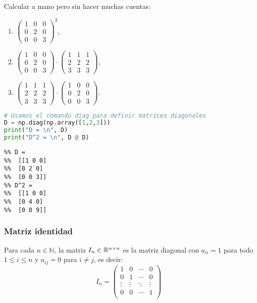 \begin{ejercicio} Calcular a mano pero sin hacer muchas cuentas:
\begin{enumerate}
\item   $\begin{pmatrix}1&0&0 \\ 0&2&0 \\ 0& 0 & 3\end{pmatrix}^3$,
\item   $\begin{pmatrix}1&0&0 \\ 0&2&0 \\ 0& 0 & 3\end{pmatrix} \cdot \begin{pmatrix}1&1&1 \\ 2&2&2 \\ 3& 3 & 3\end{pmatrix}$,
\item   $\begin{pmatrix}1&1&1 \\ 2&2&2 \\ 3& 3 & 3\end{pmatrix} \cdot \begin{pmatrix}1&0&0 \\ 0&2&0 \\ 0& 0 & 3\end{pmatrix}$.
\end{enumerate}
\end{ejercicio}

\begin{Shaded}
\begin{lstlisting}[language=Python]
# Usamos el comando diag para definir matrices diagonales
D = np.diag(np.array([1,2,3]))
print("D = \n", D)
print("D^2 = \n", D @ D)
\end{lstlisting}
\end{Shaded}

\begin{verbatim}
%% D =
%%  [[1 0 0]
%%  [0 2 0]
%%  [0 0 3]]
%% D^2 =
%%  [[1 0 0]
%%  [0 4 0]
%%  [0 0 9]]
\end{verbatim}

\subsubsection{Matriz identidad}

Para cada $n \in \mathbb{N}$, la matriz $I_n \in \mathbb R^{n \times n}$ es la matriz diagonal con $a_{ii} = 1$ para todo $1 \le i \le n$ y $a_{ij} = 0$ para $i \ne j$, es decir:
$$
I_n =\begin{pmatrix}1&0&\cdots &0\\0&1&\cdots &0\\\vdots &\vdots &\ddots &\vdots \\0&0&\cdots &1\\\end{pmatrix}
$$

